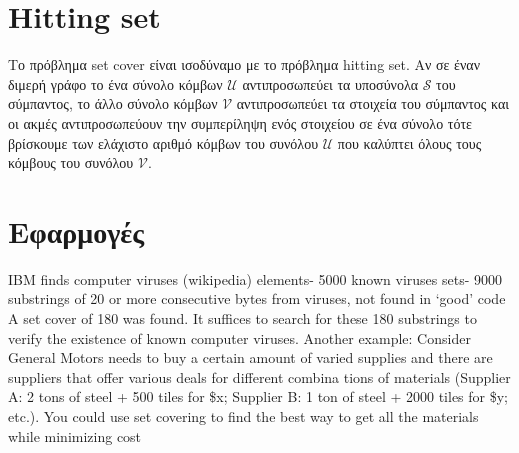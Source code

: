 \section{Hitting set}
Το πρόβλημα set cover είναι ισοδύναμο με το πρόβλημα hitting set. Αν σε έναν διμερή γράφο το ένα σύνολο κόμβων ${\mathcal{U}}$ αντιπροσωπεύει τα υποσύνολα ${\mathcal{S}}$ του σύμπαντος, το άλλο σύνολο κόμβων ${\mathcal{V}}$ αντιπροσωπεύει τα στοιχεία του σύμπαντος και οι ακμές αντιπροσωπεύουν την συμπερίληψη ενός στοιχείου σε ένα σύνολο τότε βρίσκουμε των ελάχιστο αριθμό κόμβων του συνόλου ${\mathcal{U}}$ που καλύπτει όλους τους κόμβους του συνόλου ${\mathcal{V}}$.

\section{Εφαρμογές}
IBM finds computer viruses (wikipedia) 
elements- 5000 known viruses 
sets- 9000 substrings of 20 or more consecutive bytes from viruses, not found in ‘good’ code 
A set cover of 180 was found.  It suffices to search 
for these 180 substrings to verify the existence of 
known computer viruses. 
Another example:  Consider General Motors needs to 
buy a certain amount of varied supplies and there are 
suppliers that offer various deals for different combina
tions of materials (Supplier A: 2 tons of steel + 500 tiles 
for \$x; Supplier B: 1 ton of steel + 2000 tiles for \$y; etc.).  You could use set covering to find the best way to 
get all the materials while minimizing cost